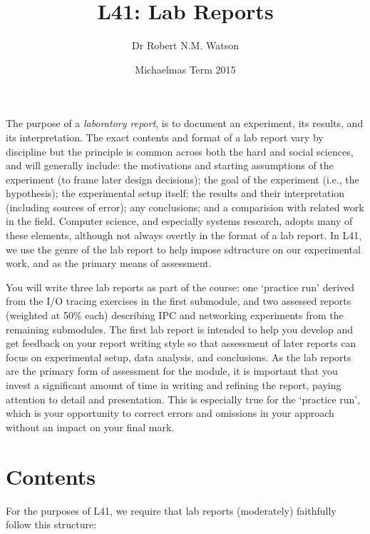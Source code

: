 \documentclass[a4paper,10pt]{article}
\begin{document}
\title{L41: Lab Reports}
\author{Dr Robert N.M. Watson}
\date{Michaelmas Term 2015}
\maketitle

The purpose of a \textit{laboratory report}, is to document an experiment, its
results, and its interpretation.
The exact contents and format of a lab report vary by discipline but the
principle is common across both the hard and social sciences, and will
generally include: the motivations and starting assumptions of the experiment
(to frame later design decisions); the goal of the experiment (i.e., the
hypothesis); the experimental setup itself; the results and their
interpretation (including sources of error); any conclusions; and a
comparision with related work in the field.
Computer science, and especially systems research, adopts many of these
elements, although not always overtly in the format of a lab report.
In L41, we use the genre of the lab report to help impose sdtructure on our
experimental work, and as the primary means of assessment.

You will write three lab reports as part of the course: one `practice run'
derived from the I/O tracing exercises in the first submodule, and two
assessed reports (weighted at 50\% each) describing IPC and networking
experiments from the remaining submodules.
The first lab report is intended to help you develop and get feedback on your
report writing style so that assessment of later reports can focus on
experimental setup, data analysis, and conclusions.
As the lab reports are the primary form of assessment for the module, it is
important that you invest a significant amount of time in writing and refining
the report, paying attention to detail and presentation.
This is especially true for the `practice run', which is your opportunity to
correct errors and omissions in your approach without an impact on your final
mark.

\section*{Contents}

For the purposes of L41, we require that lab reports (moderately) faithfully
follow this structure:
\end{document}
